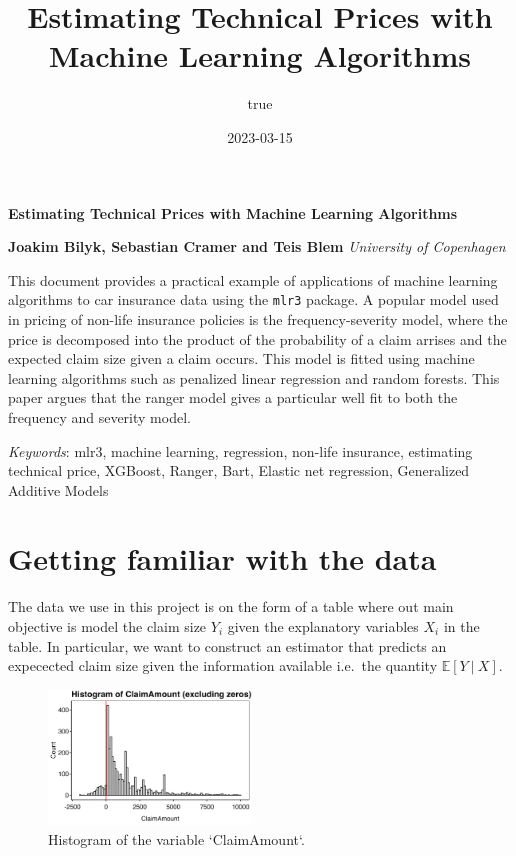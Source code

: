 \documentclass[
]{article}
\title{Estimating Technical Prices with Machine Learning Algorithms}
\author{true}
\date{2023-03-15}
\begin{document}
\Large\textbf{Estimating Technical Prices with Machine Learning
Algorithms}
\normalsize

\noindent \textbf{ Joakim Bilyk, Sebastian Cramer and Teis
Blem} \hfill  \emph{\small University of Copenhagen}   


\hbox{\vrule height .2pt width 39.14pc}

\noindent This document provides a practical example of applications of
machine learning algorithms to car insurance data using the
\texttt{mlr3} package. A popular model used in pricing of non-life
insurance policies is the frequency-severity model, where the price is
decomposed into the product of the probability of a claim arrises and
the expected claim size given a claim occurs. This model is fitted using
machine learning algorithms such as penalized linear regression and
random forests. This paper argues that the ranger model gives a
particular well fit to both the frequency and severity model.


\noindent \emph{Keywords}: mlr3, machine learning, regression, non-life
insurance, estimating technical price, XGBoost, Ranger, Bart, Elastic
net regression, Generalized Additive Models \par

 \hbox{\vrule height .2pt width 39.14pc}




{
\hypersetup{linkcolor=black}
\setcounter{tocdepth}{2}
\tableofcontents
}
\newpage

\hypertarget{getting-familiar-with-the-data}{%
\section{Getting familiar with the
data}\label{getting-familiar-with-the-data}}

The data we use in this project is on the form of a table where out main
objective is model the claim size \(Y_i\) given the explanatory
variables \(X_i\) in the table. In particular, we want to construct an
estimator that predicts an expecected claim size given the information
available i.e.~the quantity \(\mathbb E[Y\ \vert\ X]\).

\begin{figure}
  \begin{center}
    \includegraphics[width=0.48\textwidth]{figures/plot1.png}
  \end{center}
  \caption{Histogram of the variable `ClaimAmount`.}
\end{figure}
\end{document}
